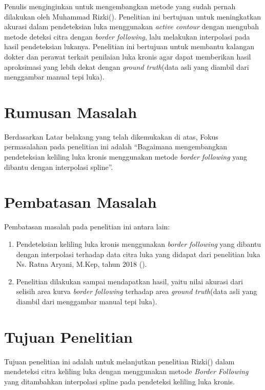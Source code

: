 Penulis menginginkan untuk mengembangkan metode yang sudah 
pernah dilakukan oleh Muhammad Rizki(\cite{MRizki}). Penelitian ini 
bertujuan untuk meningkatkan akurasi dalam pendeteksian 
luka menggunakan \textit{active contour} dengan mengubah 
metode deteksi citra dengan \textit{border following}, lalu 
melakukan interpolasi pada hasil pendeteksian lukanya.
Penelitian ini bertujuan untuk membantu kalangan dokter dan 
perawat terkait penilaian luka kronis agar dapat memberikan 
hasil aproksimasi yang lebih dekat dengan \textit{ground
truth}(data asli yang diambil dari menggambar manual tepi luka).

\section{Rumusan Masalah}
Berdasarkan Latar belakang yang telah dikemukakan di atas, 
Fokus permasalahan pada penelitian ini adalah “Bagaimana 
mengembangkan pendeteksian keliling luka kronis menggunakan metode 
\textit{border following} yang dibantu dengan interpolasi spline”.

\section{Pembatasan Masalah}
Pembatasan masalah pada penelitian ini antara lain:
\begin{enumerate}
	\item Pendeteksian keliling luka kronis menggunakan 
	\textit{border following} yang dibantu dengan interpolasi 
	terhadap data citra luka yang 
	didapat dari penelitian luka Ns. Ratna Aryani, M.Kep, 
	tahun 2018 (\cite{Aryani:2018}).
	\item Penelitian dilakukan sampai mendapatkan hasil, 
	yaitu nilai akurasi dari selisih area kurva 
	\textit{border following} terhadap area 
	\textit{ground truth}(data asli yang diambil dari
	menggambar manual tepi luka).
\end{enumerate}

\section{Tujuan Penelitian}
Tujuan penelitian ini adalah untuk melanjutkan penelitian 
Rizki(\cite{MRizki}) dalam mendeteksi citra keliling luka dengan menggunakan metode 
\textit{Border Following} yang ditambahkan interpolasi spline
pada pendeteksi keliling luka kronis.


